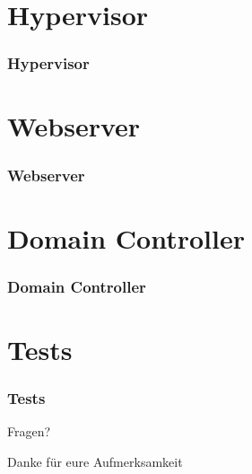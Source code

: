 \documentclass{beamer}
\begin{document}
\section{Hypervisor}
\begin{frame}[label=hypervisor]
\frametitle{Hypervisor}
\end{frame}
\section{Webserver}
\begin{frame}[label=webserver]
\frametitle{Webserver}
\end{frame}
\section{Domain Controller}
\begin{frame}[label=domain-controller]
\frametitle{Domain Controller}
\end{frame}
\section{Tests}
\begin{frame}[label=tests]
\frametitle{Tests}
\end{frame}
\begin{frame}[label=fragen]
\Huge{\centerline{Fragen?}}
\end{frame}

\begin{frame}[label=danke]
\Huge{\centerline{Danke für eure Aufmerksamkeit}}
\end{frame}
\end{document}
